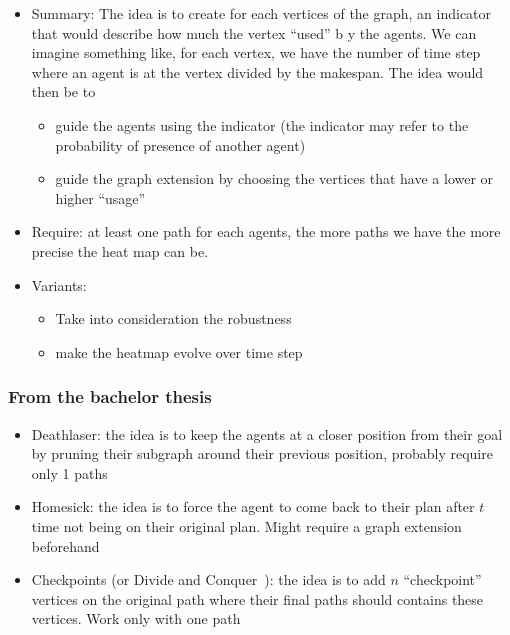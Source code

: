 \begin{itemize}
  \item Summary: The idea is to create for each vertices of the graph, an indicator that would describe how much the vertex ``used'' b y the agents. We can imagine something like, for each vertex, we have the number of time step where an agent is at the vertex divided by the makespan. The idea would then be to \begin{itemize}
    \item guide the agents using the indicator (the indicator may refer to the probability of presence of another agent)
    \item guide the graph extension by choosing the vertices that have a lower or higher ``usage''
  \end{itemize}
  \item Require: at least one path for each agents, the more paths we have the more precise the heat map can be.
  \item Variants: \begin{itemize}
    \item Take into consideration the robustness~\cite{atstfewabazh20a,atstfestko20a}
    \item make the heatmap evolve over time step
  \end{itemize} 
\end{itemize}



\subsubsection{From the bachelor thesis}
\begin{itemize}
  \item Deathlaser: the idea is to keep the agents at a closer position from their goal by pruning their subgraph around their previous position, probably require only 1 paths
  \item Homesick: the idea is to force the agent to come back to their plan after $t$ time not being on their original plan. Might require a graph extension beforehand 
  \item Checkpoints (or Divide and Conquer~\cite{yulav16a}): the idea is to add $n$ ``checkpoint'' vertices on the original path where their final paths should contains these vertices. Work only with one path 
\end{itemize}


